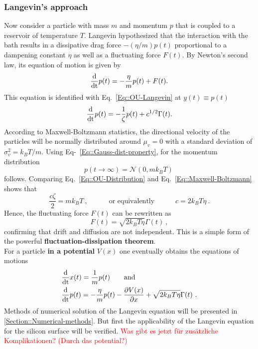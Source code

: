 	\subsubsection{Langevin's approach}
	Now consider a particle with mass $m$ and momentum $p$ that is coupled to a reservoir of temperature $T$. Langevin hypothesized \cite{langevin1908theorie} that the interaction with the bath results in a dissipative drag force $- ({\eta}/{m}) p(t)$ proportional to a dampening constant $\eta$ as well as a fluctuating force $F(t)$. By Newton's second law, its equation of motion is given by
	\begin{equation}
		\frac{\text{d}}{\text{\text{d}t}} p(t) =	- \frac{\eta}{m} p(t) + F(t).
	\end{equation}
	This equation is identified with Eq.~\eqref{Eq::OU-Langevin} at $y(t) \equiv p(t)$
	\begin{equation}
		\frac{\text{d}}{\text{\text{d}t}} p(t) =	- \frac{1}{\zeta} p(t) + { c^{1/2}}{} \Gamma(t).
	\end{equation}
	According to Maxwell-Boltzmann statistics, the directional velocity of the particles will be normally distributed around $\mu_v = 0$ with a standard deviation of $\sigma_v^2 =	k_B T /	m$. Using Eq-~\eqref{Eq::Gauss-dist-property}, for the momentum distribution 
	\begin{equation} \label{Eq::Maxwell-Boltzmann}
		p(t\rightarrow \infty) =	\mathcal{N}(0, m k_B T)~
	\end{equation}
	follows. Comparing \def\equationautorefname{Equations}Eq.~\eqref{Eq::OU-Distribution} and \def\equationautorefname{}Eq.~\eqref{Eq::Maxwell-Boltzmann} \def\equationautorefname{Equation}shows that
	\begin{equation}
		\frac{c \zeta}{2} =	m k_B T~, \qquad \quad \text{or equivalently} \qquad \quad c =	{2 k_B T \eta }~.
	\end{equation}
	Hence, the fluctuating force $F(t)$ can be rewritten as
	\begin{equation}
		F(t) =	\sqrt{2 k_B T \eta} \Gamma(t)~,
	\end{equation}
	confirming that drift and diffusion are not independent. This is a simple form of the powerful \textbf{fluctuation-dissipation theorem}. \\
	
	For a particle \textbf{in a potential} $V(x)$ one eventually obtains the equations of motions
	\begin{align} \label{Eq::Langevin-eq-motion-set-x}
		&\frac{\text{d}}{\text{\text{d}t}} x(t) =	\frac{1}{m} p(t) \qquad \text{and}\\
		\label{Eq::Langevin-eq-motion-set-p}
		&\frac{\text{d}}{\text{\text{d}t}} p(t) =	- \frac{\eta}{m} p(t) - \frac{\partial V(x)}{\partial x} + \sqrt{2 k_B T \eta } \Gamma(t) ~.
	\end{align}
	Methods of numerical solution of the Langevin equation will be presented in \autoref{Section::Numerical-methods}. But first the applicability of the Langevin equation for the silicon surface will be verified. \textcolor{red}{Was gibt es jetzt für zusätzliche Komplikationen? (Durch das potential?)}
